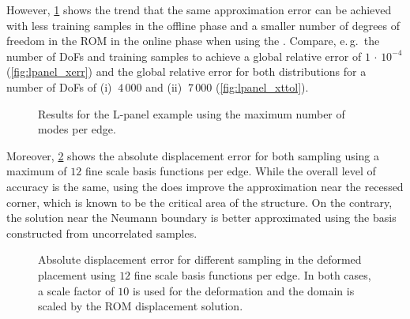 \documentclass[AMA,STIX1COL,doublespace]{WileyNJD-v2}
\newcommand{\LpanelFieldsNumModes}{12}
\begin{document}
However, \cref{fig:lpanel_2y} shows the trend that 
the same approximation error can be achieved with less training samples
in the offline phase and a smaller number
of degrees of freedom in the ROM in the online phase when using
the .
Compare, e.\,g.\, the number of DoFs and training samples to achieve a global
relative error of $1\,\cdot\,10^{-4}$ (\cref{fig:lpanel_xerr}) and
the global relative error for both distributions
for a number of DoFs of (i) $~4\,000$ and (ii) $~7\,000$ (\cref{fig:lpanel_xttol}).
\begin{figure}[htb]
	\centering
	\hfill
	\caption{Results for the L-panel example using the maximum number of modes per edge.}%
	\label{fig:lpanel_2y}
\end{figure}
Moreover, \cref{fig:lpanel_contour} shows the absolute displacement error
for both sampling  using a maximum of $\LpanelFieldsNumModes{}$ fine scale basis functions per edge.
While the overall level of accuracy is the same, using the  does improve the approximation near the recessed corner, which is
known to be the critical area of the structure.
On the contrary, the solution near the Neumann boundary is better approximated
using the basis constructed from uncorrelated samples.
\begin{figure}[htb]
    \centering
    \hfill
    \caption{Absolute displacement error for different sampling  in the deformed placement using $\LpanelFieldsNumModes{}$ fine scale basis functions per edge.
    In both cases, a scale factor of $10$ is used for the deformation and the domain is scaled by the ROM displacement solution.}%
    \label{fig:lpanel_contour}
\end{figure}
\FloatBarrier%
\end{document}
